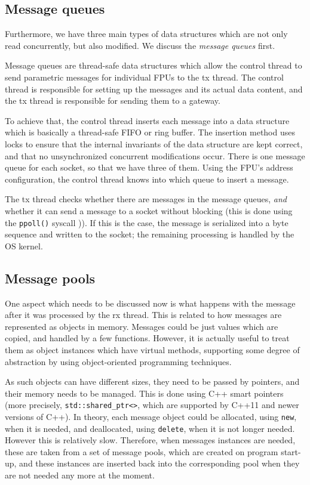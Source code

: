 \documentclass[fontsize=12,a4paper]{scrartcl}
\begin{document}
\subsection{Message queues}
Furthermore, we have three main types of data structures which are not
only read concurrently, but also modified. We discuss the
\emph{message queues} first.

Message queues are thread-safe data structures which allow the control
thread to send parametric messages for individual FPUs to the tx
thread. The control thread is responsible for setting up the messages
and its actual data content, and the tx thread is responsible for
sending them to a gateway.

To achieve that, the control thread inserts each message into a data
structure which is basically a thread-safe FIFO or ring buffer.  The
insertion method uses locks to ensure that the internal invariants of
the data structure are kept correct, and that no unsynchronized
concurrent modifications occur. There is one message queue for each
socket, so that we have three of them. Using the FPU's address
configuration, the control thread knows into which queue to insert a
message.

The tx thread checks whether there are messages in the message queues,
\emph{and} whether it can send a message to a socket without blocking
(this is done using the \texttt{ppoll()} syscall
\cite[p. 51]{Love:2013:LSP})). If this is the case, the message is
serialized into a byte sequence and written to the socket; the
remaining processing is handled by the OS kernel.



\subsection{Message pools}

One aspect which needs to be discussed now is what happens with the
message after it was processed by the rx thread. This is related to
how messages are represented as objects in memory. Messages could be
just values which are copied, and handled by a few functions. However,
it is actually useful to treat them as object instances which have
virtual methods, supporting some degree of abstraction by using
object-oriented programming techniques.

As such objects can have different sizes, they need to be passed by
pointers, and their memory needs to be managed.  This is done using
C++ smart pointers (more precisely, \texttt{std::shared\_ptr<>}, which
are supported by C++11 and newer versions of C++). In theory, each
message object could be allocated, using \texttt{new}, when it is
needed, and deallocated, using \texttt{delete}, when it is not longer
needed. However this is relatively slow. Therefore, when messages
instances are needed, these are taken from a set of message pools,
which are created on program start-up, and these instances are
inserted back into the corresponding pool when they are not needed any
more at the moment.
\end{document}

